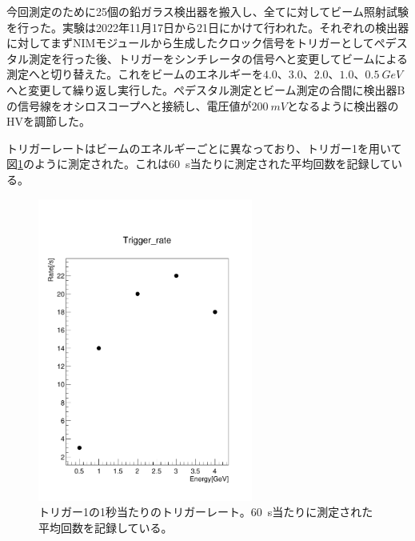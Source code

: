今回測定のために25個の鉛ガラス検出器を搬入し、全てに対してビーム照射試験を行った。実験は2022年11月17日から21日にかけて行われた。それぞれの検出器に対してまずNIMモジュールから生成したクロック信号をトリガーとしてぺデスタル測定を行った後、トリガーをシンチレータの信号へと変更してビームによる測定へと切り替えた。これをビームのエネルギーを$4.0$、$3.0$、$2.0$、$1.0$、$\SI{0.5}{GeV}$へと変更して繰り返し実行した。ぺデスタル測定とビーム測定の合間に検出器Bの信号線をオシロスコープへと接続し、電圧値が$\SI{200}{mV}$となるように検出器のHVを調節した。

トリガーレートはビームのエネルギーごとに異なっており、トリガー1を用いて図\ref{TrgRate}のように測定された。これは\SI{60}{s}当たりに測定された平均回数を記録している。

\begin{figure}[H]
	\begin{center}
		\includegraphics[width=200pt]{./Figure/EBESAnalysis/trg_rate_reduce.pdf}
		\caption[トリガーレート]{トリガー1の1秒当たりのトリガーレート。\SI{60}{s}当たりに測定された平均回数を記録している。}
		\label{TrgRate}
	\end{center}
\end{figure}

